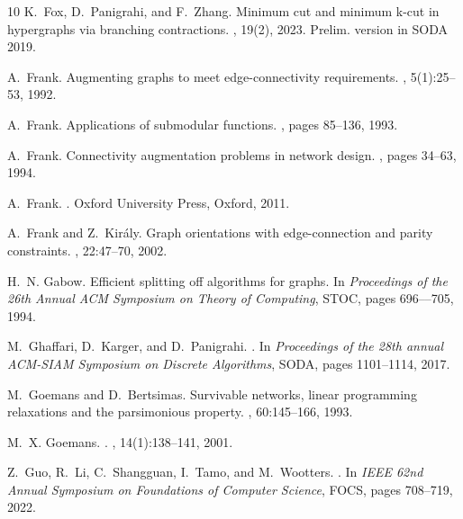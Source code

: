\documentclass{article}
\begin{document}
\begin{thebibliography}{10}
K.~Fox, D.~Panigrahi, and F.~Zhang.
\newblock Minimum cut and minimum k-cut in hypergraphs via branching contractions.
, 19(2), 2023.
\newblock Prelim. version in SODA 2019.

A.~Frank.
\newblock Augmenting graphs to meet edge-connectivity requirements.
, 5(1):25--53, 1992.

A.~Frank.
\newblock Applications of submodular functions.
, pages 85--136, 1993.

A.~Frank.
\newblock Connectivity augmentation problems in network design.
, pages 34--63, 1994.

A.~Frank.
.
\newblock Oxford University Press, Oxford, 2011.

A.~Frank and Z.~Kir\'{a}ly.
\newblock Graph orientations with edge-connection and parity constraints.
, 22:47--70, 2002.

H.~N. Gabow.
\newblock Efficient splitting off algorithms for graphs.
\newblock In {\em Proceedings of the 26th Annual ACM Symposium on Theory of Computing}, STOC, pages 696--–705, 1994.

M.~Ghaffari, D.~Karger, and D.~Panigrahi.
.
\newblock In {\em Proceedings of the 28th annual ACM-SIAM Symposium on Discrete Algorithms}, SODA, pages 1101--1114, 2017.

M.~Goemans and D.~Bertsimas.
\newblock Survivable networks, linear programming relaxations and the parsimonious property.
, 60:145--166, 1993.

M.~X. Goemans.
.
, 14(1):138--141, 2001.

Z.~Guo, R.~Li, C.~Shangguan, I.~Tamo, and M.~Wootters.
.
\newblock In {\em IEEE 62nd Annual Symposium on Foundations of Computer Science}, FOCS, pages 708--719, 2022.


\end{thebibliography}
\end{document}
